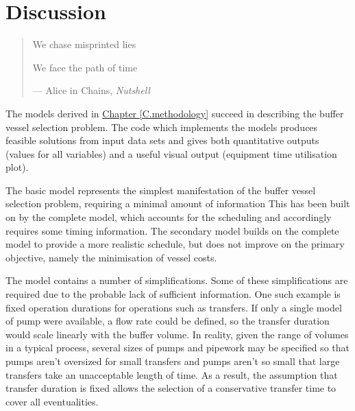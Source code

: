 %
%
%
%

\chapter{Discussion}\label{C.discussion}

\begin{quote}
We chase misprinted lies

We face the path of time

\hspace{2cm}--- Alice in Chains, \emph{Nutshell}
\end{quote}

The models derived in \hyperref[C.methodology]{Chapter \ref*{C.methodology}}
succeed in describing the buffer vessel selection problem.
The code which implements the models produces feasible
solutions from input data sets and gives both quantitative outputs (values for
all variables) and a useful visual output (equipment time utilisation plot).

The basic model represents the simplest manifestation of the buffer vessel
selection problem, requiring a minimal amount of information
This has been built on by the complete model, which accounts for the scheduling
and accordingly requires some timing information.
The secondary model builds on the complete model to provide a more realistic
schedule, but does not improve on the primary objective, namely the
minimisation of vessel costs.

The model contains a number of simplifications.
Some of these simplifications are required due to the probable lack of
sufficient information.
One such example is fixed operation durations for operations such as
transfers.
If only a single model of pump were available, a flow rate could be
defined, so the transfer duration would scale linearly with the buffer volume.
In reality, given the range of volumes in a typical process, several sizes of
pumps and pipework may be specified so that pumps aren't oversized for small
transfers and pumps aren't so small that large transfers take an unacceptable
length of time.  As a result, the assumption that transfer duration is fixed
allows the selection of a conservative transfer time to cover all
eventualities.

